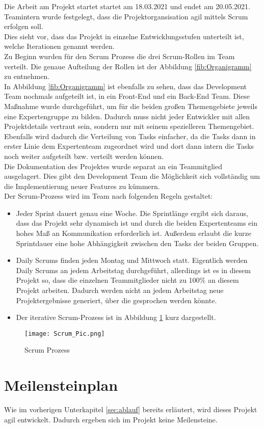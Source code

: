 \label{sec:ablauf}
Die Arbeit am Projekt startet startet am 18.03.2021 und endet am 20.05.2021. \\
Teamintern wurde festgelegt, dass die Projektorgansisation agil mittels \gls{Scrum} erfolgen soll.\\
Dies sieht vor, dass das Projekt in einzelne Entwicklungsstufen unterteilt ist, welche Iterationen genannt werden.\\
Zu Beginn wurden für den Scrum Prozess die drei Scrum-Rollen im Team verteilt. Die genaue Aufteilung der Rollen ist der Abbildung \ref{fib:Organigramm} zu entnehmen. \\
In Abbildung \ref{fib:Organigramm} ist ebenfalls zu sehen, dass das \gls{Development Team} nochmals aufgeteilt ist, in ein \gls{Front-End} und ein \gls{Back-End} Team. Diese Maßnahme wurde durchgeführt, um für die beiden großen Themengebiete jeweils eine Expertengruppe zu bilden. Dadurch muss nicht jeder Entwickler mit allen Projektdetails vertraut sein, sondern nur mit seinem spezielleren Themengebiet. Ebenfalls wird dadurch die Verteilung von Tasks einfacher, da die Tasks dann in erster Linie dem Expertenteam zugeordnet wird und dort dann intern die Tasks noch weiter aufgeteilt bzw. verteilt werden können. \\
Die Dokumentation des Projektes wurde separat an ein Teammitglied ausgelagert. Dies gibt den \gls{Development Team} die Möglichkeit sich vollständig um die Implementierung neuer Features zu kümmern.\\
Der Scrum-Prozess wird im Team nach folgenden Regeln gestaltet:
\begin{itemize}
\item Jeder Sprint dauert genau eine Woche. Die Sprintlänge ergibt sich daraus, dass das Projekt sehr dynamisch ist und durch die beiden Expertenteams ein hohes Maß an Kommunikation erforderlich ist. Außerdem erlaubt die kurze Sprintdauer eine hohe Abhängigkeit zwischen den Tasks der beiden Gruppen.
\item \gls{Daily Scrum}s finden jeden Montag und Mittwoch statt. Eigentlich werden \gls{Daily Scrum}s an jedem Arbeitstag durchgeführt, allerdings ist es in diesem Projekt so, dass die einzelnen Teammitglieder nicht zu 100\% an diesem Projekt arbeiten. Dadurch werden nicht an jedem Arbeitstag neue Projektergebnisse generiert, über die gesprochen werden könnte. 
\item Der iterative Scrum-Prozess ist in Abbildung \ref{fib:Scrum} kurz dargestellt.
\end{itemize} 

\begin{figure}[h]
\centering
\texttt{[image: Scrum\_Pic.png]}
\caption{Scrum Prozess}
\label{fib:Scrum}
\end{figure}

\section{Meilensteinplan}

Wie im vorherigen Unterkapitel \ref{sec:ablauf} bereits erläutert, wird dieses Projekt agil entwickelt. Dadurch ergeben sich im Projekt keine Meilensteine.